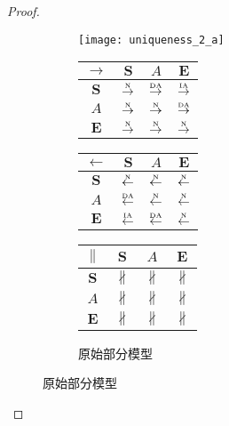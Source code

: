 \begin{proof}
\begin{figure}[htbp]
  \begin{subfigure}{1\textwidth}
    \centering
    \begin{minipage}[b]{1\textwidth}
      \centering
      \texttt{[image: uniqueness\_2\_a]}
    \end{minipage}
    \begin{minipage}[b]{0.3\textwidth}
      \vspace{1em}
      \centering
      \begin{tabular}{|c|c|c|c|} \hline
        $\rightarrow$ & $\bm{S}$ & $A$ & $\bm{E}$\\ \hline
        $\bm{S}$ & $\overset{\text{\tiny{N}}}{\rightarrow}$ & $\overset{\text{\tiny{DA}}}{\rightarrow}$ & $\overset{\text{\tiny{IA}}}{\rightarrow}$\\ \hline
        $A$ & $\overset{\text{\tiny{N}}}{\rightarrow}$ & $\overset{\text{\tiny{N}}}{\rightarrow}$ & $\overset{\text{\tiny{DA}}}{\rightarrow}$\\ \hline
        $\bm{E}$ & $\overset{\text{\tiny{N}}}{\rightarrow}$ & $\overset{\text{\tiny{N}}}{\rightarrow}$ & $\overset{\text{\tiny{N}}}{\rightarrow}$\\ \hline
      \end{tabular}
    \end{minipage}
    \begin{minipage}[b]{0.3\textwidth}
      \vspace{1em}
      \centering
      \begin{tabular}{|c|c|c|c|} \hline
        $\leftarrow$ & $\bm{S}$ & $A$ & $\bm{E}$\\ \hline
        $\bm{S}$ & $\overset{\text{\tiny{N}}}{\leftarrow}$ & $\overset{\text{\tiny{N}}}{\leftarrow}$ & $\overset{\text{\tiny{N}}}{\leftarrow}$\\ \hline
        $A$ & $\overset{\text{\tiny{DA}}}{\leftarrow}$ & $\overset{\text{\tiny{N}}}{\leftarrow}$ & $\overset{\text{\tiny{N}}}{\leftarrow}$\\ \hline
        $\bm{E}$ & $\overset{\text{\tiny{IA}}}{\leftarrow}$ & $\overset{\text{\tiny{DA}}}{\leftarrow}$ & $\overset{\text{\tiny{N}}}{\leftarrow}$\\ \hline
      \end{tabular}
    \end{minipage}
    \begin{minipage}[b]{0.3\textwidth}
      \vspace{1em}
      \centering
      \begin{tabular}{|c|c|c|c|} \hline
        $\parallel$ & $\bm{S}$ & $A$ & $\bm{E}$\\ \hline
        $\bm{S}$ & $\nparallel$ & $\nparallel$ & $\nparallel$\\ \hline
        $A$ & $\nparallel$ & $\nparallel$ & $\nparallel$\\ \hline
        $\bm{E}$ & $\nparallel$ & $\nparallel$ & $\nparallel$\\ \hline
      \end{tabular}
    \end{minipage}
    \caption{原始部分模型}
    \label{fig:uniqueness_2_a}
  \end{subfigure}


\end{figure}
\end{proof}
